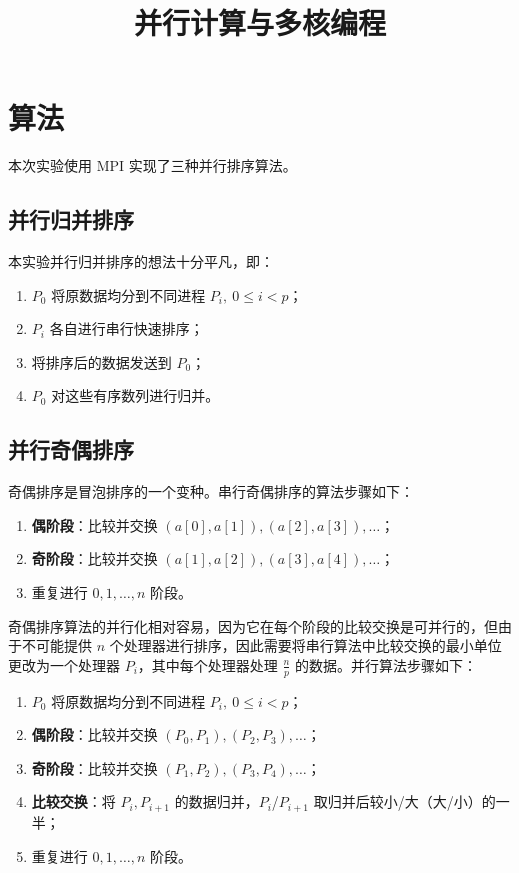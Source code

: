 \documentclass{zjureport-zh}
\title{并行计算与多核编程}
\begin{document}
\makecover

\section{算法}
\par 本次实验使用 MPI 实现了三种并行排序算法。

\subsection{并行归并排序}
\par 本实验并行归并排序的想法十分平凡，即：

\begin{enumerate}[itemindent=2em,label=\roman*)]
	\item $P_0$ 将原数据均分到不同进程 $P_i,\ 0 \leq i < p$；
	\item $P_i$ 各自进行串行快速排序；
	\item 将排序后的数据发送到 $P_0$；
	\item $P_0$ 对这些有序数列进行归并。
\end{enumerate}

\subsection{并行奇偶排序}
\par 奇偶排序是冒泡排序的一个变种。串行奇偶排序的算法步骤如下：
\begin{enumerate}[itemindent=2em,label=\roman*)]
	\item \textbf{偶阶段}：比较并交换 $(a[0], a[1]), (a[2], a[3]), \dots$；
	\item \textbf{奇阶段}：比较并交换 $(a[1], a[2]), (a[3], a[4]), \dots$；
	\item 重复进行 $0, 1, \dots, n$ 阶段。
\end{enumerate}

\par 奇偶排序算法的并行化相对容易，因为它在每个阶段的比较交换是可并行的，但由于不可能提供 $n$ 个处理器进行排序，因此需要将串行算法中比较交换的最小单位更改为一个处理器 $P_i$，其中每个处理器处理 $\frac{n}{p}$ 的数据。并行算法步骤如下：
\begin{enumerate}[itemindent=2em,label=\roman*)]
	\item $P_0$ 将原数据均分到不同进程 $P_i,\ 0 \leq i < p$；
	\item \textbf{偶阶段}：比较并交换 $(P_0, P_1), (P_2, P_3), \dots$；
	\item \textbf{奇阶段}：比较并交换 $(P_1, P_2), (P_3, P_4), \dots$；
	\item \textbf{比较交换}：将 $P_i, P_{i+1}$ 的数据归并，$P_i$/$P_{i+1}$ 取归并后较小/大（大/小）的一半；
	\item 重复进行 $0, 1, \dots, n$ 阶段。
\end{enumerate}
\end{document}
